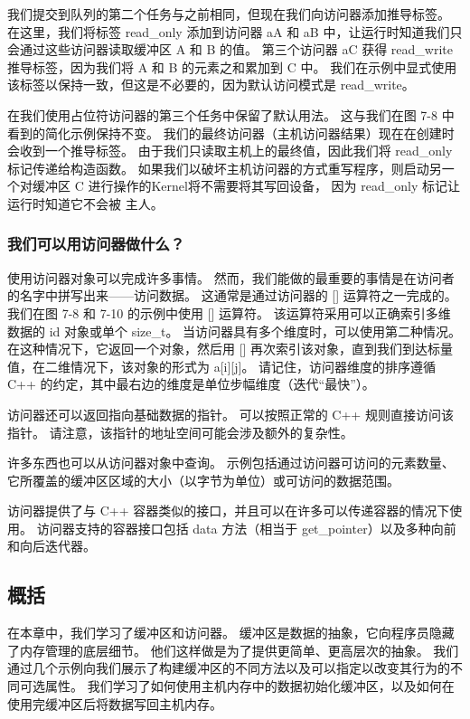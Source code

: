 我们提交到队列的第二个任务与之前相同，但现在我们向访问器添加推导标签。 
在这里，我们将标签 read\_only 添加到访问器 aA 和 aB 中，让运行时知道我们只会通过这些访问器读取缓冲区 A 和 B 的值。 
第三个访问器 aC 获得 read\_write 推导标签，因为我们将 A 和 B 的元素之和累加到 C 中。
我们在示例中显式使用该标签以保持一致，但这是不必要的，因为默认访问模式是 read\_write。

在我们使用占位符访问器的第三个任务中保留了默认用法。 这与我们在图 7-8 中看到的简化示例保持不变。 
我们的最终访问器（主机访问器结果）现在在创建时会收到一个推导标签。 
由于我们只读取主机上的最终值，因此我们将 read\_only 标记传递给构造函数。 
如果我们以破坏主机访问器的方式重写程序，则启动另一个对缓冲区 C 进行操作的Kernel将不需要将其写回设备，
因为 read\_only 标记让运行时知道它不会被 主人。

\subsubsection{我们可以用访问器做什么？}
使用访问器对象可以完成许多事情。 然而，我们能做的最重要的事情是在访问者的名字中拼写出来——访问数据。 
这通常是通过访问器的 [] 运算符之一完成的。 我们在图 7-8 和 7-10 的示例中使用 [] 运算符。 
该运算符采用可以正确索引多维数据的 id 对象或单个 size\_t。 当访问器具有多个维度时，可以使用第二种情况。 
在这种情况下，它返回一个对象，然后用 [] 再次索引该对象，直到我们到达标量值，在二维情况下，该对象的形式为 a[i][j]。 
请记住，访问器维度的排序遵循 C++ 的约定，其中最右边的维度是单位步幅维度（迭代“最快”）。

访问器还可以返回指向基础数据的指针。 可以按照正常的 C++ 规则直接访问该指针。 
请注意，该指针的地址空间可能会涉及额外的复杂性。

许多东西也可以从访问器对象中查询。 
示例包括通过访问器可访问的元素数量、它所覆盖的缓冲区区域的大小（以字节为单位）或可访问的数据范围。

访问器提供了与 C++ 容器类似的接口，并且可以在许多可以传递容器的情况下使用。 
访问器支持的容器接口包括 data 方法（相当于 get\_pointer）以及多种向前和向后迭代器。

\subsection{概括}
在本章中，我们学习了缓冲区和访问器。 缓冲区是数据的抽象，它向程序员隐藏了内存管理的底层细节。 
他们这样做是为了提供更简单、更高层次的抽象。 
我们通过几个示例向我们展示了构建缓冲区的不同方法以及可以指定以改变其行为的不同可选属性。 
我们学习了如何使用主机内存中的数据初始化缓冲区，以及如何在使用完缓冲区后将数据写回主机内存。

